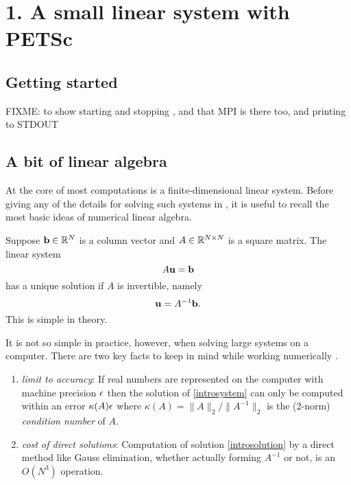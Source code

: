
\chapter{1. A small linear system with PETSc}

\section{Getting started}

FIXME: to show starting and stopping \PETSc, and that MPI is there too, and printing to STDOUT



\section{A bit of linear algebra}

At the core of most \PETSc computations is a finite-dimensional linear system.  Before giving any of the details for solving such systems in \PETSc, it is useful to recall the most basic ideas of numerical linear algebra.

Suppose $\mathbf{b}\in \mathbb{R}^{N}$ is a column vector and $A\in\mathbb{R}^{N\times N}$ is a square matrix.  The linear system
\begin{equation}
A \mathbf{u} = \mathbf{b} \label{introsystem}
\end{equation}
has a unique solution if $A$ is invertible, namely
\begin{equation}
\mathbf{u} = A^{-1} \mathbf{b}. \label{introsolution}
\end{equation}
This is simple in theory.

It is not so simple in practice, however, when solving large systems on a computer.  There are two key facts to keep in mind while working numerically  \citep{TrefethenBau}.
\renewcommand{\labelenumi}{\roman{enumi})}
\begin{enumerate}
\item \emph{limit to accuracy}:  If real numbers are represented on the computer with machine precision $\epsilon$ then the solution of \eqref{introsystem} can only be computed within an error $\kappa(A) \epsilon$ where $\kappa(A) = \|A\|_2/\|A^{-1}\|_2$ is the (2-norm) \emph{condition number} of $A$.
\item \emph{cost of direct solutions}:  Computation of solution \eqref{introsolution} by a direct method like Gauss elimination, whether actually forming $A^{-1}$ or not, is an $O(N^3)$ operation.
\end{enumerate}

